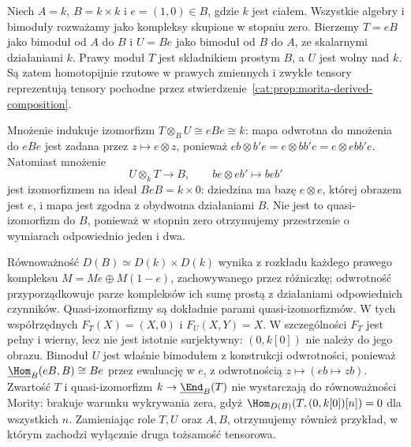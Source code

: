 \begin{przyklad}\label{cat:ex:morita-one-sided-inverse}
Niech $A=k$, $B=k\times k$ i $e=(1,0)\in B$, gdzie $k$ jest ciałem. Wszystkie algebry i bimoduły rozważamy jako kompleksy skupione w stopniu zero. Bierzemy $T=eB$ jako bimoduł od $A$ do $B$ i $U=Be$ jako bimoduł od $B$ do $A$, ze skalarnymi działaniami $k$. Prawy moduł $T$ jest składnikiem prostym $B$, a $U$ jest wolny nad $k$. Są zatem homotopijnie rzutowe w prawych zmiennych i zwykłe tensory reprezentują tensory pochodne przez stwierdzenie~\ref{cat:prop:morita-derived-composition}.

Mnożenie indukuje izomorfizm $T\otimes_B U\cong eBe\cong k$: mapa odwrotna do mnożenia do $eBe$ jest zadana przez $z\mapsto e\otimes z$, ponieważ $eb\otimes b'e=e\otimes bb'e=e\otimes ebb'e$. Natomiast mnożenie
\[
 U\otimes_k T\longrightarrow B,\qquad
 be\otimes eb'\longmapsto beb'
\]
jest izomorfizmem na ideał $BeB=k\times0$: dziedzina ma bazę $e\otimes e$, której obrazem jest $e$, i mapa jest zgodna z obydwoma działaniami $B$. Nie jest to quasi-izomorfizm do $B$, ponieważ w stopniu zero otrzymujemy przestrzenie o wymiarach odpowiednio jeden i dwa.

Równoważność $D(B)\simeq D(k)\times D(k)$ wynika z rozkładu każdego prawego kompleksu $M=Me\oplus M(1-e)$, zachowywanego przez różniczkę; odwrotność przyporządkowuje parze kompleksów ich sumę prostą z działaniami odpowiednich czynników. Quasi-izomorfizmy są dokładnie parami quasi-izomorfizmów. W tych współrzędnych $F_T(X)=(X,0)$ i $F_U(X,Y)=X$. W szczególności $F_T$ jest pełny i wierny, lecz nie jest istotnie surjektywny: $(0,k[0])$ nie należy do jego obrazu. Bimoduł $U$ jest właśnie bimodułem z konstrukcji odwrotności, ponieważ $\underline{\Hom}_B(eB,B)\cong Be$ przez ewaluację w $e$, z odwrotnością $z\mapsto(eb\mapsto zb)$. Zwartość $T$ i quasi-izomorfizm $k\to\underline{\End}_B(T)$ nie wystarczają do równoważności Mority: brakuje warunku wykrywania zera, gdyż $\Hom_{D(B)}(T,(0,k[0])[n])=0$ dla wszystkich $n$. Zamieniając role $T,U$ oraz $A,B$, otrzymujemy również przykład, w którym zachodzi wyłącznie druga tożsamość tensorowa.
\end{przyklad}

